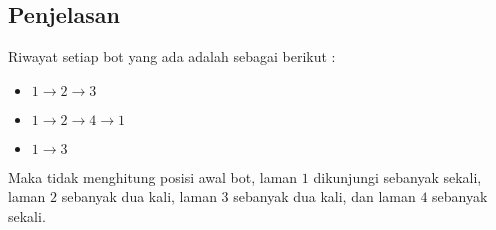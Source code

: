 \documentclass{article}
\begin{document}
\subsection*{Penjelasan}
Riwayat setiap  bot yang ada adalah sebagai berikut :
\begin{itemize}
    \setlength\itemsep{0pt}
    \item $1 \rightarrow 2 \rightarrow 3$
    \item $1 \rightarrow 2 \rightarrow 4 \rightarrow 1$
    \item $1 \rightarrow 3$
\end{itemize}
Maka tidak menghitung posisi awal bot, laman $1$ dikunjungi sebanyak sekali, laman $2$ sebanyak dua kali, laman $3$ sebanyak dua kali, dan laman $4$ sebanyak sekali.

\pagebreak
\end{document}
